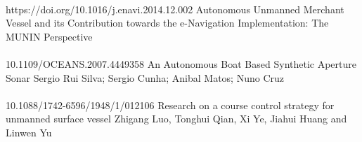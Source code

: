 \paragraph{} https://doi.org/10.1016/j.enavi.2014.12.002  Autonomous Unmanned Merchant Vessel and its Contribution towards the e-Navigation Implementation: The MUNIN Perspective

\paragraph{} 10.1109/OCEANS.2007.4449358 An Autonomous Boat Based Synthetic Aperture Sonar Sergio Rui Silva; Sergio Cunha; Anibal Matos; Nuno Cruz

\paragraph{} 10.1088/1742-6596/1948/1/012106 Research on a course control strategy for unmanned surface vessel  Zhigang Luo, Tonghui Qian, Xi Ye, Jiahui Huang and Linwen Yu






